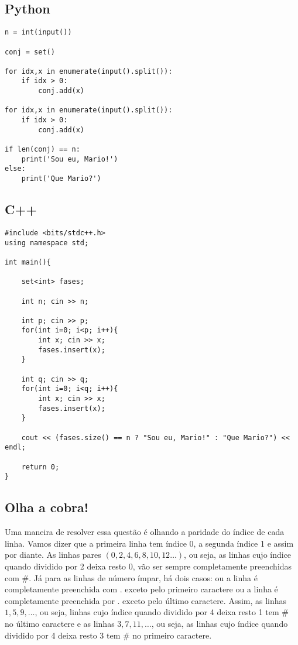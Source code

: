 \documentclass[11pt,fancychapters]{article}
\begin{document}
\subsection{Python}
\begin{lstlisting}[style=python]
n = int(input())
 
conj = set()
 
for idx,x in enumerate(input().split()):
    if idx > 0:
        conj.add(x)
        
for idx,x in enumerate(input().split()):
    if idx > 0:
        conj.add(x)
        
if len(conj) == n:
    print('Sou eu, Mario!')
else:
    print('Que Mario?')
\end{lstlisting}
 \subsection{C++}
\begin{lstlisting}[style=c++]
#include <bits/stdc++.h>
using namespace std;
 
int main(){
 
    set<int> fases;
 
    int n; cin >> n;
    
    int p; cin >> p;
    for(int i=0; i<p; i++){
        int x; cin >> x; 
        fases.insert(x);
    }
 
    int q; cin >> q;
    for(int i=0; i<q; i++){
        int x; cin >> x;
        fases.insert(x);
    }
 
    cout << (fases.size() == n ? "Sou eu, Mario!" : "Que Mario?") << endl;
  
    return 0;
}
\end{lstlisting}
\newpage
\begin{center}\section{Olha a cobra!}\end{center}
\noindent
Uma maneira de resolver essa questão é olhando a paridade do índice de cada linha. Vamos dizer que a primeira linha tem índice 0, a segunda índice 1 e assim por diante. As linhas pares $(0, 2, 4, 6, 8, 10, 12\dots)$, ou seja, as linhas cujo índice quando dividido por 2 deixa resto 0, vão ser sempre completamente preenchidas com \#. Já para as linhas de número ímpar, há dois casos: ou a linha é completamente preenchida com . exceto pelo primeiro caractere ou a linha é completamente preenchida por . exceto pelo último caractere. Assim, as linhas $1, 5, 9, \dots$, ou seja, linhas cujo índice quando dividido por 4 deixa resto 1 tem \# no último caractere e as linhas $3, 7, 11, \dots$, ou seja, as linhas cujo índice quando dividido por 4 deixa resto 3 tem \# no primeiro caractere.
\end{document}
